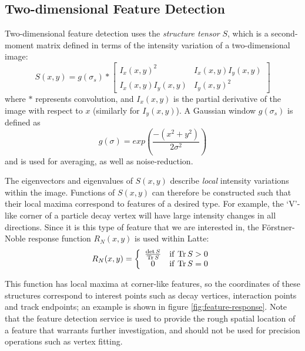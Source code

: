 \subsection{Two-dimensional Feature Detection}
Two-dimensional feature detection uses the \emph{structure tensor} $S$, which is a second-moment matrix defined in terms of the intensity variation of a two-dimensional image:~\citep{Morgan2010}
\begin{equation}\label{eqn:structure_tensor}
    S(x,y) = g(\sigma_s) \ast \left[ \begin{array}{cc} I_x(x,y)^2 & I_x(x,y)I_y(x,y) \\ I_x(x,y)I_y(x,y) & I_y(x,y)^2 \end{array} \right]
\end{equation}
where $\ast$ represents convolution, and $I_x(x,y)$ is the partial derivative of the image with respect to $x$ (similarly for $I_y(x,y)$). A Gaussian window $g(\sigma_s)$ is defined as
\begin{equation}\label{eqn:feature_det_gaussian_window}
    g(\sigma) = exp\left( \frac{-(x^2 + y^2)}{2\sigma^2} \right)
\end{equation}
and is used for averaging, as well as noise-reduction.

The eigenvectors and eigenvalues of $S(x,y)$ describe \emph{local} intensity variations within the image. Functions of $S(x,y)$ can therefore be constructed such that their local maxima correspond to features of a desired type. For example, the `V'-like corner of a particle decay vertex will have large intensity changes in all directions. Since it is this type of feature that we are interested in, the F\"orstner-Noble response function $R_N(x,y)$ is used within Latte:
\begin{equation}\label{eqn:forstner-noble}
    R_N(x,y) = \left\{ \begin{array}{cl} \frac{\det S}{\mathrm{Tr}\, S} & \mathrm{if~} \mathrm{Tr}\, S > 0 \\ 0 & \mathrm{if~} \mathrm{Tr}\, S = 0 \end{array} \right.
\end{equation}

This function has local maxima at corner-like features, so the coordinates of these structures correspond to interest points such as decay vertices, interaction points and track endpoints; an example is shown in figure \ref{fig:feature-response}. Note that the feature detection service is used to provide the rough spatial location of a feature that warrants further investigation, and should not be used for precision operations such as vertex fitting.

